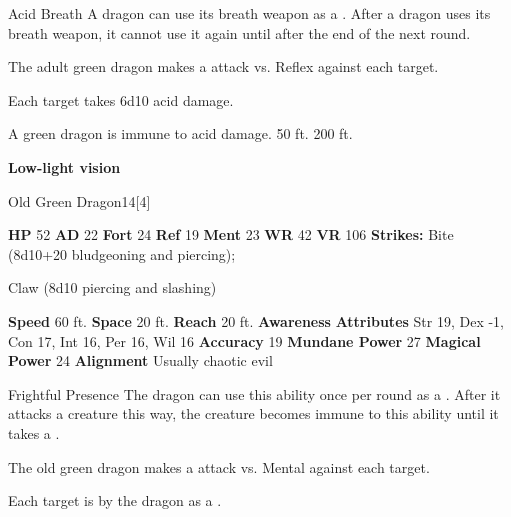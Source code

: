     \begin{freeability}{Acid Breath}
      A dragon can use its breath weapon as a .
      After a dragon uses its breath weapon, it cannot use it again until after the end of the next round.
      \par The adult green dragon makes a  attack
        vs. Reflex against each target.
    
    \hit Each target takes 6d10 acid damage.
    \end{freeability}
  
      
       A green dragon is immune to acid damage.
     50 ft.
     200 ft.
    \par\noindent\textbf{Low-light vision}
  

  \begin{monsubsection}{Old Green Dragon}{14}[4]
    \vspace{-1em}\vspace{-1em}
    \vspace{0em}

    
    

    \begin{spellcontent}
      \begin{spelltargetinginfo}
        \pari \textbf{HP} 52 \monsep
          \textbf{AD} 22 \monsep
          \textbf{Fort} 24 \monsep
          \textbf{Ref} 19 \monsep
          \textbf{Ment} 23
        \pari \textbf{WR} 42 \monsep
        \textbf{VR} 106
        \pari \textbf{Strikes:}
            Bite  (8d10+20 bludgeoning and piercing);
\par Claw  (8d10 piercing and slashing)
      \end{spelltargetinginfo}
    \end{spellcontent}
    \begin{monsterfooter}
      \pari \textbf{Speed} 60 ft. \monsep
        \textbf{Space} 20 ft. \monsep
        \textbf{Reach} 20 ft.
      \pari \textbf{Awareness} 
      \pari \textbf{Attributes}
        Str 19, Dex -1,
        Con 17, Int 16,
        Per 16, Wil 16
      \pari \textbf{Accuracy} 19 \monsep
        \textbf{Mundane Power} 27 \monsep
      \textbf{Magical Power} 24
      \pari \textbf{Alignment} Usually chaotic evil
    \end{monsterfooter}
  \end{monsubsection}
  \begin{freeability}{Frightful Presence}
      The dragon can use this ability once per round as a .
      After it attacks a creature this way, the creature becomes immune to this ability until it takes a .
      \par The old green dragon makes a  attack
        vs. Mental against each target.
    
    \hit Each target is  by the dragon as a .
    \end{freeability}
  

